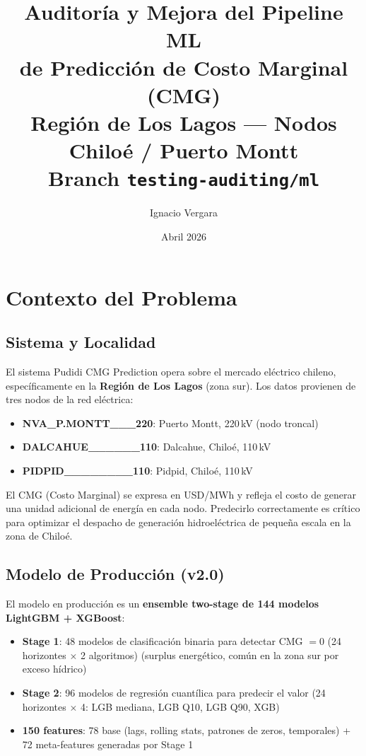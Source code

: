 \documentclass[11pt,a4paper]{article}
\title{
    \vspace{-1cm}
    \textbf{Auditor\'ia y Mejora del Pipeline ML\\de Predicci\'on de Costo Marginal (CMG)}\\[0.5em]
    \large Regi\'on de Los Lagos --- Nodos Chilo\'e / Puerto Montt\\[0.3em]
    \normalsize Branch \texttt{testing-auditing/ml}
}
\author{Ignacio Vergara}
\date{Abril 2026}
\begin{document}
\maketitle
\thispagestyle{fancy}

\tableofcontents
\newpage

\section{Contexto del Problema}
\label{sec:contexto}

\subsection{Sistema y Localidad}

El sistema Pudidi CMG Prediction opera sobre el mercado el\'ectrico chileno, espec\'ificamente en la \textbf{Regi\'on de Los Lagos} (zona sur). Los datos provienen de tres nodos de la red el\'ectrica:

\begin{itemize}
    \item \textbf{NVA\_P.MONTT\_\_\_220}: Puerto Montt, 220\,kV (nodo troncal)
    \item \textbf{DALCAHUE\_\_\_\_\_\_110}: Dalcahue, Chilo\'e, 110\,kV
    \item \textbf{PIDPID\_\_\_\_\_\_\_\_110}: Pidpid, Chilo\'e, 110\,kV
\end{itemize}

El CMG (Costo Marginal) se expresa en USD/MWh y refleja el costo de generar una unidad adicional de energ\'ia en cada nodo. Predecirlo correctamente es cr\'itico para optimizar el despacho de generaci\'on hidroel\'ectrica de peque\~na escala en la zona de Chilo\'e.

\subsection{Modelo de Producci\'on (v2.0)}

El modelo en producci\'on es un \textbf{ensemble two-stage de 144 modelos LightGBM + XGBoost}:

\begin{itemize}
    \item \textbf{Stage 1}: 48 modelos de clasificaci\'on binaria para detectar CMG $= 0$ (24 horizontes $\times$ 2 algoritmos) (surplus energ\'etico, com\'un en la zona sur por exceso h\'idrico)
    \item \textbf{Stage 2}: 96 modelos de regresi\'on cuant\'ilica para predecir el valor (24 horizontes $\times$ 4: LGB mediana, LGB Q10, LGB Q90, XGB)
    \item \textbf{150 features}: 78 base (lags, rolling stats, patrones de zeros, temporales) + 72 meta-features generadas por Stage 1
\end{itemize}
\end{document}
